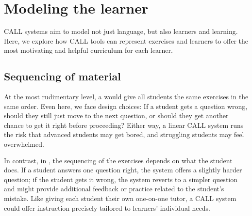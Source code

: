 








\section{Modeling the learner}

CALL systems aim to model not just language, but also learners and learning.  Here, we explore how CALL tools can represent exercises and learners to offer the most motivating and helpful curriculum for each learner.


\subsection{Sequencing of material}

At the most rudimentary level, a  would give all students the same exercises in the same order.  Even here, we face design choices: If a student gets a question wrong, should they still just move to the next question, or should they get another chance to get it right before proceeding?  Either way, a linear CALL system runs the risk that advanced students may get bored, and struggling students may feel overwhelmed.  

In contrast, in , the sequencing of the exercises depends on what the
student does. If a student answers one question right, the system offers a slightly
harder question; if the student gets it wrong, the
system reverts to a simpler question and might provide additional
feedback or practice related to the student's mistake. Like giving each student their own one-on-one tutor, a CALL system could offer instruction precisely tailored to learners' individual needs. 

